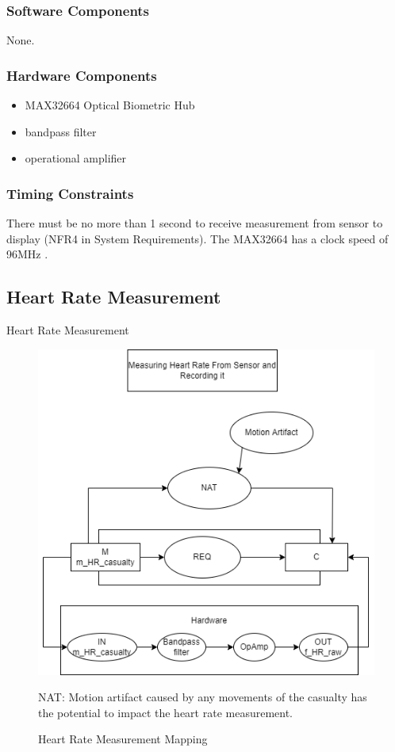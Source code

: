 \documentclass{article}
\newcounter{mnum}
\newcommand{\mthemnum}{M\themnum}
\begin{document}
\begin{description}
        \subsubsection{Software Components}
        None.
        \subsubsection{Hardware Components}
        \begin{itemize}
            \item MAX32664 Optical Biometric Hub
            \item bandpass filter
            \item operational amplifier
        \end{itemize}
     
        \subsubsection{Timing Constraints}
        There must be no more than 1 second to receive measurement from sensor to display (NFR4 in System Requirements).  The MAX32664 has a clock speed of 96MHz \citep{false}.
    \newpage
    
    
    \subsection{Heart Rate Measurement} 
    \item [\refstepcounter{mnum} \mthemnum \label{HR_M}:] Heart Rate Measurement
    \begin{figure}[!htb]
    	\centering
    	\includegraphics[width=0.5\linewidth]{mccharts-HeartRateModule.drawio.png}
    	\caption{Heart Rate Measurement Mapping}
    	{NAT: Motion artifact caused by any movements of the casualty has the potential to impact the heart rate measurement.}
    \end{figure}

\end{description}
\end{document}
